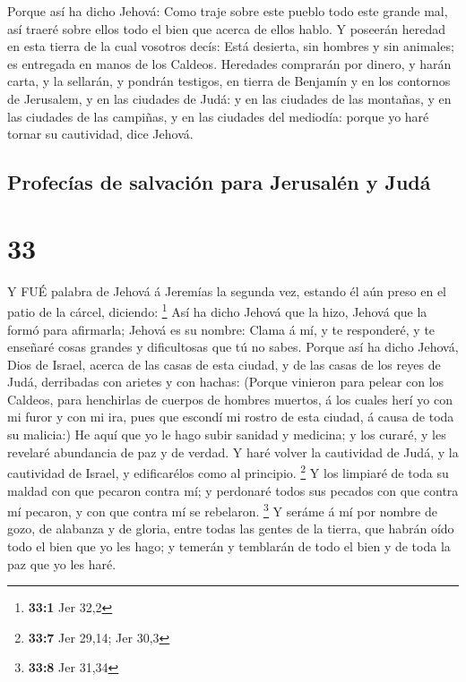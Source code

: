  Porque así ha dicho Jehová: Como traje sobre este pueblo
todo este grande mal, así traeré sobre ellos todo el bien que acerca de
ellos hablo.  Y poseerán heredad en esta tierra de la cual
vosotros decís: Está desierta, sin hombres y sin animales; es entregada
en manos de los Caldeos.  Heredades comprarán por dinero, y
harán carta, y la sellarán, y pondrán testigos, en tierra de Benjamín y
en los contornos de Jerusalem, y en las ciudades de Judá: y en las
ciudades de las montañas, y en las ciudades de las campiñas, y en las
ciudades del mediodía: porque yo haré tornar su cautividad, dice Jehová.

\hypertarget{profecuxedas-de-salvaciuxf3n-para-jerusaluxe9n-y-juduxe1}{%
\subsection{Profecías de salvación para Jerusalén y
Judá}\label{profecuxedas-de-salvaciuxf3n-para-jerusaluxe9n-y-juduxe1}}

\hypertarget{section-32}{%
\section{33}\label{section-32}}

 Y FUÉ palabra de Jehová á Jeremías la segunda vez, estando
él aún preso en el patio de la cárcel, diciendo: \footnote{\textbf{33:1}
  Jer 32,2}  Así ha dicho Jehová que la hizo, Jehová que la
formó para afirmarla; Jehová es su nombre:  Clama á mí, y te
responderé, y te enseñaré cosas grandes y dificultosas que tú no sabes.
 Porque así ha dicho Jehová, Dios de Israel, acerca de las
casas de esta ciudad, y de las casas de los reyes de Judá, derribadas
con arietes y con hachas:  (Porque vinieron para pelear con
los Caldeos, para henchirlas de cuerpos de hombres muertos, á los cuales
herí yo con mi furor y con mi ira, pues que escondí mi rostro de esta
ciudad, á causa de toda su malicia:)  He aquí que yo le hago
subir sanidad y medicina; y los curaré, y les revelaré abundancia de paz
y de verdad.  Y haré volver la cautividad de Judá, y la
cautividad de Israel, y edificarélos como al principio. \footnote{\textbf{33:7}
  Jer 29,14; Jer 30,3}  Y los limpiaré de toda su maldad con
que pecaron contra mí; y perdonaré todos sus pecados con que contra mí
pecaron, y con que contra mí se rebelaron. \footnote{\textbf{33:8} Jer
  31,34}  Y seráme á mí por nombre de gozo, de alabanza y de
gloria, entre todas las gentes de la tierra, que habrán oído todo el
bien que yo les hago; y temerán y temblarán de todo el bien y de toda la
paz que yo les haré.

